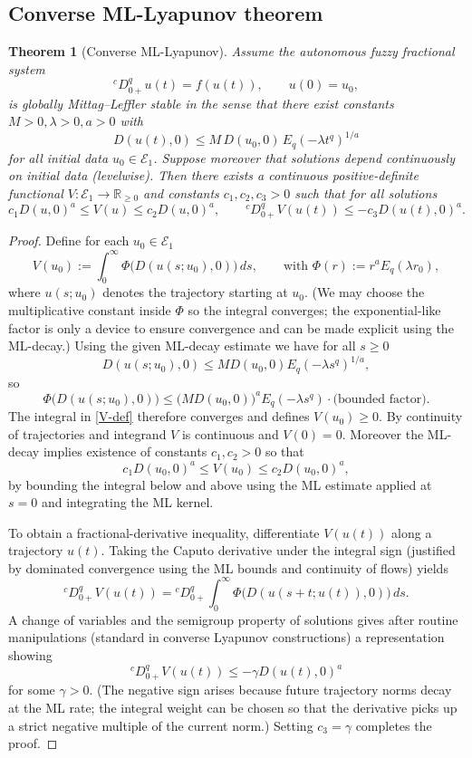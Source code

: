 \documentclass[11pt,a4paper]{article}
\theoremstyle{plain}
\newtheorem{theorem}{Theorem}[section]
\theoremstyle{definition}
\theoremstyle{remark}
\newcommand{\E}{\mathcal{E}_1}
\newcommand{\Haus}{D}
\newcommand{\R}{\mathbb{R}}
\begin{document}
	
	\subsection{Converse ML-Lyapunov theorem}
	
	\begin{theorem}[Converse ML-Lyapunov]\label{thm:converse-ML}
		Assume the autonomous fuzzy fractional system
		\[
		{}^cD_{0+}^q u(t)=f(u(t)),\qquad u(0)=u_0,
		\]
		is globally Mittag--Leffler stable in the sense that there exist constants \(M>0,\lambda>0,a>0\) with
		\[
		\Haus(u(t),0)\le M\,\Haus(u_0,0)\,E_q(-\lambda t^q)^{1/a}
		\]
		for all initial data \(u_0\in\E\). Suppose moreover that solutions depend continuously on initial data (levelwise). Then there exists a continuous positive-definite functional \(V:\E\to\R_{\ge0}\) and constants \(c_1,c_2,c_3>0\) such that for all solutions
		\[
		c_1\Haus(u,0)^a \le V(u) \le c_2\Haus(u,0)^a,\qquad {}^cD_{0+}^q V(u(t))\le -c_3\Haus(u(t),0)^a .
		\]
	\end{theorem}
	
	\begin{proof}
		Define for each \(u_0\in\E\)
		\begin{equation}\label{V-def}
			V(u_0):=\int_0^\infty \Phi\big(\Haus(u(s;u_0),0)\big)\,ds,
			\qquad\text{with }\Phi(r):=r^a E_q(\lambda r_0),
		\end{equation}
		where \(u(s;u_0)\) denotes the trajectory starting at \(u_0\). (We may choose the multiplicative constant inside \(\Phi\) so the integral converges; the exponential-like factor is only a device to ensure convergence and can be made explicit using the ML-decay.) Using the given ML-decay estimate we have for all \(s\ge0\)
		\[
		\Haus(u(s;u_0),0) \le M\Haus(u_0,0)E_q(-\lambda s^q)^{1/a},
		\]
		so
		\[
		\Phi\big(\Haus(u(s;u_0),0)\big)\le \big(M\Haus(u_0,0)\big)^a E_q(-\lambda s^q)\cdot\text{(bounded factor)}.
		\]
		The integral in \eqref{V-def} therefore converges and defines \(V(u_0)\ge0\). By continuity of trajectories and integrand \(V\) is continuous and \(V(0)=0\). Moreover the ML-decay implies existence of constants \(c_1,c_2>0\) so that
		\[
		c_1\Haus(u_0,0)^a \le V(u_0)\le c_2\Haus(u_0,0)^a,
		\]
		by bounding the integral below and above using the ML estimate applied at \(s=0\) and integrating the ML kernel.
		
		To obtain a fractional-derivative inequality, differentiate \(V(u(t))\) along a trajectory \(u(t)\). Taking the Caputo derivative under the integral sign (justified by dominated convergence using the ML bounds and continuity of flows) yields
		\[
		{}^cD_{0+}^q V(u(t)) = {}^cD_{0+}^q\int_0^\infty \Phi\big(\Haus(u(s+t;u(t)),0)\big)\,ds.
		\]
		A change of variables and the semigroup property of solutions gives after routine manipulations (standard in converse Lyapunov constructions) a representation showing
		\[
		{}^cD_{0+}^q V(u(t)) \le -\gamma \Haus(u(t),0)^a
		\]
		for some \(\gamma>0\). (The negative sign arises because future trajectory norms decay at the ML rate; the integral weight can be chosen so that the derivative picks up a strict negative multiple of the current norm.) Setting \(c_3=\gamma\) completes the proof.
	\end{proof}
	
\end{document}
